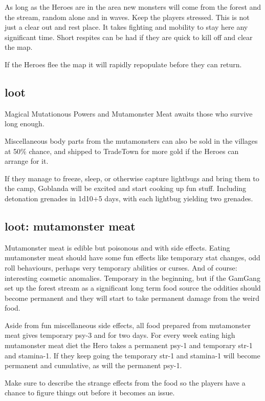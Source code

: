 As long as the Heroes are in the area new monsters will come from the forest and the stream, random alone and in waves. Keep the players stressed. This is not just a clear out and rest place. It takes fighting and mobility to stay here any significant time. Short respites can be had if they are quick to kill off and clear the map.

If the Heroes flee the map it will rapidly repopulate before they can return.


\subsection*{loot}
Magical Mutationous Powers and Mutamonster Meat awaits those who survive long enough.

Miscellaneous body parts from the mutamonsters can also be sold in the villages at 50\% chance, and shipped to TradeTown for more gold if the Heroes can arrange for it.

If they manage to freeze, sleep, or otherwise capture lightbugs and bring them to the camp, Goblanda will be excited and start cooking up fun stuff. Including detonation grenades in 1d10+5 days, with each lightbug yielding two grenades.


\subsection*{loot: mutamonster meat}
Mutamonster meat is edible but poisonous and with side effects. Eating mutamonster meat should have some fun effects like temporary stat changes, odd roll behaviours, perhaps very temporary abilities or curses. And of course: interesting cosmetic anomalies. Temporary in the beginning, but if the GamGang set up the forest stream as a significant long term food source the oddities should become permanent and they will start to take permanent damage from the weird food.

Aside from fun miscellaneous side effects, all food prepared from mutamonster meat gives temporary psy-3 and for two days. For every week eating high mutamonster meat diet the Hero takes a permanent psy-1 and temporary str-1 and stamina-1. If they keep going the temporary str-1 and stamina-1 will become permanent and cumulative, as will the permanent psy-1.

Make sure to describe the strange effects from the food so the players have a chance to figure things out before it becomes an issue.


